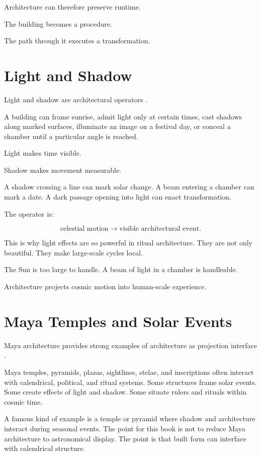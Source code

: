 \documentclass[11pt]{book}
\begin{document}
Architecture can therefore preserve runtime.

The building becomes a procedure.

The path through it executes a transformation.

\section{Light and Shadow}

Light and shadow are architectural operators \cite{Ruggles2005AncientAstronomy,Aveni2001Skywatchers}.

A building can frame sunrise, admit light only at certain times, cast shadows along marked surfaces, illuminate an image on a festival day, or conceal a chamber until a particular angle is reached.

Light makes time visible.

Shadow makes movement measurable.

A shadow crossing a line can mark solar change. A beam entering a chamber can mark a date. A dark passage opening into light can enact transformation.

The operator is:

\[
\text{celestial motion}
\rightarrow
\text{visible architectural event}.
\]

This is why light effects are so powerful in ritual architecture. They are not only beautiful. They make large-scale cycles local.

The Sun is too large to handle. A beam of light in a chamber is handleable.

Architecture projects cosmic motion into human-scale experience.

\section{Maya Temples and Solar Events}

Maya architecture provides strong examples of architecture as projection interface \cite{Aveni2001Skywatchers,BrickerBricker2011AstronomyMayaCodices,Coe2011Maya}.

Maya temples, pyramids, plazas, sightlines, stelae, and inscriptions often interact with calendrical, political, and ritual systems. Some structures frame solar events. Some create effects of light and shadow. Some situate rulers and rituals within cosmic time.

A famous kind of example is a temple or pyramid where shadow and architecture interact during seasonal events. The point for this book is not to reduce Maya architecture to astronomical display. The point is that built form can interface with calendrical structure.
\end{document}
